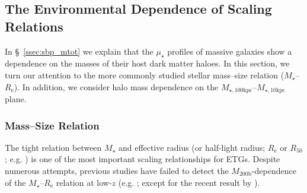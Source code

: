 \documentclass[a4paper,fleqn,usenatbib]{mnras}
\def\mstar{{$M_{\star}$}}
\def\mhalo{{$M_{\mathrm{200b}}$}}
\def\minn{{$M_{\star,10\mathrm{kpc}}$}}
\def\mtot{{$M_{\star,100\mathrm{kpc}}$}}
\def\mden{{$\mu_{\star}$}}
\begin{document}

\subsection{The Environmental Dependence of Scaling Relations}
    \label{ssec:scaling}
    
    In \S~\ref{ssec:sbp_mtot} we explain that the \mden{} profiles of massive galaxies 
    show a dependence on the masses of their host dark matter haloes. 
    In this section, we turn our attention to the more commonly studied stellar 
    mass--size relation (\mstar{}--$R_{\mathrm{e}}$). 
    In addition, we consider halo mass dependence on the 
    \mtot{}--\minn{} plane. 
    
\subsubsection{Mass--Size Relation}
    \label{sssec:mass_size}
    
    The tight relation between \mstar{} and effective radius (or half-light radius; 
    $R_{\mathrm{e}}$ or $R_{\mathrm{50}}$; e.g. \citealt{Shankar2013, Leja2013, 
    vdWel2014}) is one of the most important scaling relationships for ETGs. 
    Despite numerous attempts, previous studies have failed to detect the 
    \mhalo{}-dependence of the \mstar{}--$R_{\mathrm{e}}$ relation at low-$z$ 
    (e.g. \citealt{Weinmann2009, Nair2010, HCompany13, Cerbrian2014}; 
    except for the recent result by \citealt{Yoon2017}). 
    
\end{document}
